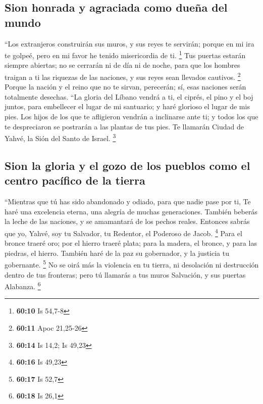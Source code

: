 \hypertarget{sion-honrada-y-agraciada-como-dueuxf1a-del-mundo}{%
\subsection{Sion honrada y agraciada como dueña del
mundo}\label{sion-honrada-y-agraciada-como-dueuxf1a-del-mundo}}

 ``Los extranjeros construirán sus muros, y sus reyes te
servirán; porque en mi ira te golpeé, pero en mi favor he tenido
misericordia de ti. \footnote{\textbf{60:10} Is 54,7-8} 
Tus puertas estarán siempre abiertas; no se cerrarán ni de día ni de
noche, para que los hombres traigan a ti las riquezas de las naciones, y
sus reyes sean llevados cautivos. \footnote{\textbf{60:11} Apoc 21,25-26}
 Porque la nación y el reino que no te sirvan, perecerán;
sí, esas naciones serán totalmente desechas.  ``La gloria
del Líbano vendrá a ti, el ciprés, el pino y el boj juntos, para
embellecer el lugar de mi santuario; y haré glorioso el lugar de mis
pies.  Los hijos de los que te afligieron vendrán a
inclinarse ante ti; y todos los que te despreciaron se postrarán a las
plantas de tus pies. Te llamarán Ciudad de Yahvé, la Sión del Santo de
Israel. \footnote{\textbf{60:14} Is 14,2; Is 49,23}

\hypertarget{sion-la-gloria-y-el-gozo-de-los-pueblos-como-el-centro-pacuxedfico-de-la-tierra}{%
\subsection{Sion la gloria y el gozo de los pueblos como el centro
pacífico de la
tierra}\label{sion-la-gloria-y-el-gozo-de-los-pueblos-como-el-centro-pacuxedfico-de-la-tierra}}

 ``Mientras que tú has sido abandonado y odiado, para que
nadie pase por ti, Te haré una excelencia eterna, una alegría de muchas
generaciones.  También beberás la leche de las naciones,
y se amamantará de los pechos reales. Entonces sabrás que yo, Yahvé, soy
tu Salvador, tu Redentor, el Poderoso de Jacob. \footnote{\textbf{60:16}
  Is 49,23}  Para el bronce traeré oro; por el hierro
traeré plata; para la madera, el bronce, y para las piedras, el hierro.
También haré de la paz su gobernador, y la justicia tu gobernante.
\footnote{\textbf{60:17} Is 52,7}  No se oirá más la
violencia en tu tierra, ni desolación ni destrucción dentro de tus
fronteras; pero tú llamarás a tus muros Salvación, y sus puertas
Alabanza. \footnote{\textbf{60:18} Is 26,1}

